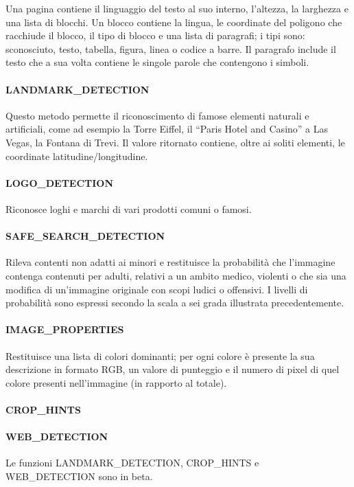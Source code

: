 Una pagina contiene il linguaggio del testo al suo interno, l'altezza, la larghezza e una lista di blocchi.
Un blocco contiene la lingua, le coordinate del poligono che racchiude il blocco, il tipo di blocco e una lista di paragrafi;
i tipi sono: sconosciuto, testo, tabella, figura, linea o codice a barre.
Il paragrafo include il testo che a sua volta contiene le singole parole che contengono i simboli.
%
\paragraph{\textsf{LANDMARK\_DETECTION}} Questo metodo permette il riconoscimento di famose elementi naturali e artificiali, come ad esempio la Torre Eiffel, il ``Paris Hotel and Casino'' a Las Vegas, la Fontana di Trevi.
Il valore ritornato contiene, oltre ai soliti elementi, le coordinate latitudine/longitudine.
%
\paragraph{\textsf{LOGO\_DETECTION}} Riconosce loghi e marchi di vari prodotti comuni o famosi. 
%
\paragraph{\textsf{SAFE\_SEARCH\_DETECTION}} Rileva contenti non adatti ai minori e restituisce la probabilità che l'immagine contenga
contenuti per adulti, relativi a un ambito medico, violenti o che sia una modifica di un'immagine originale con scopi ludici o offensivi.
I livelli di probabilità sono espressi secondo la scala a sei grada illustrata precedentemente.
%
\paragraph{\textsf{IMAGE\_PROPERTIES}} Restituisce una lista di colori dominanti; per ogni colore è presente la sua descrizione in formato RGB,
un valore di punteggio e il numero di pixel di quel colore presenti nell'immagine (in rapporto al totale).
%
\paragraph{\textsf{CROP\_HINTS}} 
%
\paragraph{\textsf{WEB\_DETECTION}}
%

Le funzioni \textsf{LANDMARK\_DETECTION}, \textsf{CROP\_HINTS} e \textsf{WEB\_DETECTION} sono in beta. %
%
%
%
